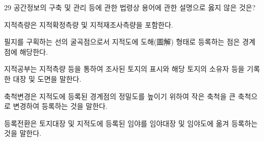 \begin{question}{29}
공간정보의 구축 및 관리 등에 관한 법령상 용어에 관한 설명으로 옳지 않은 것은?
\begin{choices}
  \item 지적측량은 지적확정측량 및 지적재조사측량을 포함한다.
  \item 필지를 구획하는 선의 굴곡점으로서 지적도에 도해(圖解) 형태로 등록하는 점은 경계점에 해당한다.
  \item 지적공부는 지적측량 등을 통하여 조사된 토지의 표시와 해당 토지의 소유자 등을 기록한 대장 및 도면을 말한다.
  \item 축척변경은 지적도에 등록된 경계점의 정밀도를 높이기 위하여 작은 축척을 큰 축척으로 변경하여 등록하는 것을 말한다.
  \item 등록전환은 토지대장 및 지적도에 등록된 임야를 임야대장 및 임야도에 옮겨 등록하는 것을 말한다.
\end{choices}
\end{question}

